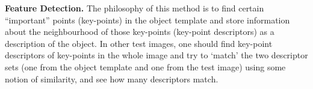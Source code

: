 \noindent
\textbf{Feature Detection.}
The philosophy of this method is to find certain ``important'' points (key-points) in the object template and store information about the neighbourhood of those key-points (key-point descriptors) as a description of the object. In other test images, one should find key-point descriptors of key-points in the whole image and try to `match' the two descriptor sets (one from the object template and one from the test image) using some notion of similarity, and see how many descriptors match.



